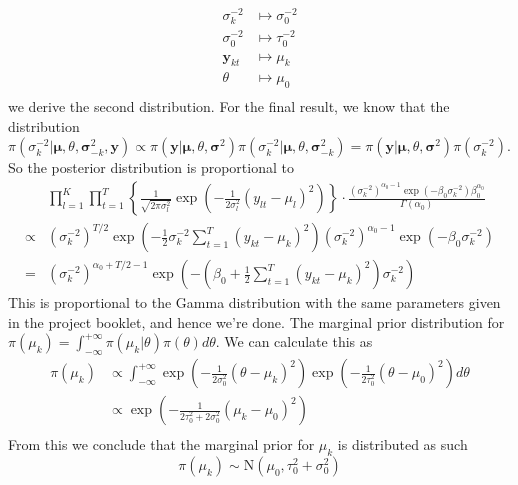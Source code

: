 \documentclass[10pt,a4paper,notitlepage]{article}
\newcommand{\y}{\mathbf{y}}
\begin{document}
\begin{equation}
\begin{aligned}
\sigma_{k}^{-2} &\mapsto \sigma_{0}^{-2}\\
\sigma_{0}^{-2} &\mapsto \tau_{0}^{-2}\\
\y_{kt} &\mapsto \mu_{k}\\
\theta &\mapsto \mu_{0}\\
\end{aligned}
\end{equation}
we derive the second distribution.
For the final result, we know that the distribution $\pi(\sigma_{k}^{-2}|\bm{\mu},\theta,\bm{\sigma}^{2}_{-k},\y)\propto \pi(\y|\bm{\mu},\theta,\bm{\sigma}^{2})\pi(\sigma_{k}^{-2}|\bm{\mu},\theta,\bm{\sigma}^{2}_{-k})=\pi(\y|\bm{\mu},\theta,\bm{\sigma}^{2})\pi(\sigma_{k}^{-2})$. So the posterior distribution is proportional to
\begin{equation}
\begin{aligned}
&\prod_{l=1}^{K}\prod_{t=1}^{T}\left\{\frac{1}{\sqrt{2\pi \sigma_{l}^{2}}}\exp\left(-\frac{1}{2\sigma_{l}^{2}}\left(y_{lt}-\mu_{l}\right)^{2}\right)\right\}\cdot \frac{\left(\sigma_{k}^{-2}\right)^{\alpha_{0}-1}\exp\left(-\beta_{0}\sigma_{k}^{-2}\right)\beta_{0}^{\alpha_{0}}}{\Gamma\left(\alpha_{0}\right)}\\
\propto &\left(\sigma_{k}^{-2}\right)^{T/2}\exp\left(-\frac{1}{2}\sigma_{k}^{-2}\sum_{t=1}^{T}\left(y_{kt}-\mu_{k}\right)^{2}\right)\left(\sigma_{k}^{-2}\right)^{\alpha_{0}-1}\exp\left(-\beta_{0}\sigma_{k}^{-2}\right)\\
= &\left(\sigma_{k}^{-2}\right)^{\alpha_{0}+T/2-1}\exp\left(-\left(\beta_{0}+\frac{1}{2}\sum_{t=1}^{T}\left(y_{kt}-\mu_{k}\right)^{2}\right)\sigma_{k}^{-2}\right)
\end{aligned}
\end{equation}
This is proportional to the Gamma distribution with the same parameters given in the project booklet, and hence we're done.
The marginal prior distribution for $\pi(\mu_{k})=\int_{-\infty}^{+\infty}\pi(\mu_{k}|\theta)\pi(\theta)d\theta$. We can calculate this as
\begin{equation}
\begin{aligned}
\pi(\mu_{k}) &\propto \int_{-\infty}^{+\infty}\exp\left(-\frac{1}{2\sigma_{0}^{2}}\left(\theta-\mu_{k}\right)^{2}\right)\exp\left(-\frac{1}{2\tau_{0}^{2}}\left(\theta-\mu_{0}\right)^{2}\right)d\theta\\
&\propto \exp\left(-\frac{1}{2\tau_{0}^{2}+2\sigma_{0}^{2}}\left(\mu_{k}-\mu_{0}\right)^{2}\right)\\
\end{aligned}
\end{equation}
From this we conclude that the marginal prior for $\mu_{k}$ is distributed as such
\begin{equation}
\pi\left(\mu_{k}\right)\sim \text{N}\left(\mu_{0},\tau_{0}^{2}+\sigma_{0}^{2}\right)
\end{equation}
\end{document}
